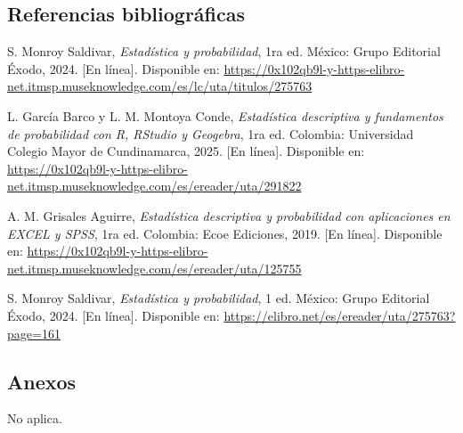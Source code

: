 \documentclass[12pt,a4paper]{article}
\begin{document}
	\vspace{0.3cm}
	
	\subsection{Referencias bibliográficas}
	
	\begin{enumerate}[label={[\arabic*]}, leftmargin=1.5cm, itemsep=6pt]
		\item S. Monroy Saldivar, \textit{Estadística y probabilidad}, 1ra ed. México: Grupo Editorial Éxodo, 2024. [En línea]. Disponible en:
		\url{https://0x102qb9l-y-https-elibro-net.itmsp.museknowledge.com/es/lc/uta/titulos/275763}
		\item L. García Barco y L. M. Montoya Conde, \textit{Estadística descriptiva y fundamentos de probabilidad con R, RStudio y Geogebra}, 1ra ed. Colombia: Universidad Colegio Mayor de Cundinamarca, 2025. [En línea]. Disponible en:
		\url{https://0x102qb9l-y-https-elibro-net.itmsp.museknowledge.com/es/ereader/uta/291822}
		\item A. M. Grisales Aguirre, \textit{Estadística descriptiva y probabilidad con aplicaciones en EXCEL y SPSS}, 1ra ed. Colombia: Ecoe Ediciones, 2019. [En línea]. Disponible en:
		\url{https://0x102qb9l-y-https-elibro-net.itmsp.museknowledge.com/es/ereader/uta/125755}
		\item S. Monroy Saldivar, \textit{Estadística y probabilidad}, 1 ed. México: Grupo Editorial Éxodo, 2024. [En línea]. Disponible en:
		\url{https://elibro.net/es/ereader/uta/275763?page=161}
	\end{enumerate}
	
	\vspace{0.3cm}
	
	\subsection{Anexos}
	
	No aplica.
	
\end{document}
